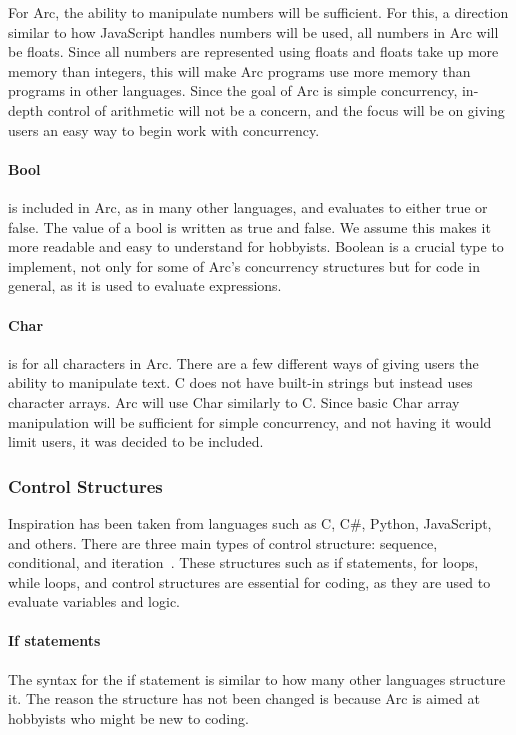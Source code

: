 For Arc, the ability to manipulate numbers will be sufficient. For this, a direction similar to how JavaScript handles numbers will be used, all numbers in Arc will be floats. Since all numbers are represented using floats and floats take up more memory than integers, this will make Arc programs use more memory than programs in other languages. Since the goal of Arc is simple concurrency, in-depth control of arithmetic will not be a concern, and the focus will be on giving users an easy way to begin work with concurrency.

\paragraph{Bool} is included in Arc, as in many other languages, and evaluates to either true or false. The value of a bool is written as true and false. We assume this makes it more readable and easy to understand for hobbyists. Boolean is a crucial type to implement, not only for some of Arc's concurrency structures but for code in general, as it is used to evaluate expressions.

\paragraph{Char} is for all characters in Arc. There are a few different ways of giving users the ability to manipulate text. C does not have built-in strings but instead uses character arrays. Arc will use Char similarly to C. Since basic Char array manipulation will be sufficient for simple concurrency, and not having it would limit users, it was decided to be included.


\subsubsection{Control Structures}
Inspiration has been taken from languages such as C, C\#, Python, JavaScript, and others. There are three main types of control structure: sequence, conditional, and iteration~\cite{CBook}. These structures such as if statements, for loops, while loops, and control structures are essential for coding, as they are used to evaluate variables and logic.



\paragraph{If statements} The syntax for the if statement is similar to how many other languages structure it. The reason the structure has not been changed is because Arc is aimed at hobbyists who might be new to coding.

